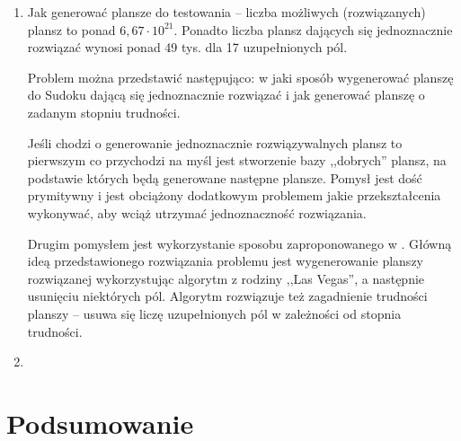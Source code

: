 \documentclass[]{project_report}
\begin{document}
	\begin{enumerate}
		\item Jak generować plansze do testowania -- liczba możliwych (rozwiązanych) plansz to ponad \(6,67 \cdot 10^{21}\)\cite{OEIS}. Ponadto liczba plansz dających się jednoznacznie rozwiązać wynosi ponad 49 tys. dla 17 uzupełnionych pól.
		
		Problem można przedstawić następująco: w jaki sposób wygenerować planszę do Sudoku dającą się jednoznacznie rozwiązać i jak generować planszę o zadanym stopniu trudności.
		
		Jeśli chodzi o generowanie jednoznacznie rozwiązywalnych plansz to pierwszym co przychodzi na myśl jest stworzenie bazy ,,dobrych'' plansz, na podstawie których będą generowane następne plansze. Pomysł jest dość prymitywny i jest obciążony dodatkowym problemem jakie przekształcenia wykonywać, aby wciąż utrzymać jednoznaczność rozwiązania.
		
		Drugim pomysłem jest wykorzystanie sposobu zaproponowanego w \cite{McGuire2013}. Główną ideą przedstawionego rozwiązania problemu jest wygenerowanie planszy rozwiązanej wykorzystując algorytm z rodziny ,,Las Vegas'', a następnie usunięciu niektórych pól. Algorytm rozwiązuje też zagadnienie trudności planszy -- usuwa się liczę uzupełnionych pól w zależności od stopnia trudności.
		
		\item 
	\end{enumerate}
	
	\section{Podsumowanie}
	
	
	\printbibliography
\end{document}
